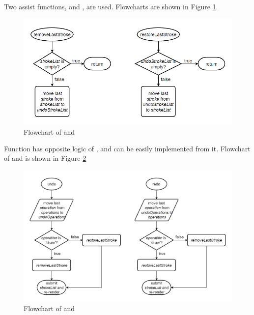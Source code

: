 \documentclass[12pt,twoside]{report}
\begin{document}
Two assist functions,  and , are
used. Flowcharts are shown in Figure \ref{fig:flowchart-helpfunc}.
\begin{figure}[h]
    \centering
    \includegraphics[width=\linewidth]{figures/flowchart-helpfunc.png}
    \caption{Flowchart of  and }
    \label{fig:flowchart-helpfunc}
\end{figure}

Function  has opposite logic of , and can be easily implemented from it. Flowchart of  and  is shown in Figure \ref{fig:flowchart-undoredo}
\begin{figure}[H]
    \centering
    \includegraphics[width=\linewidth, frame]{figures/flowchart-undoredo.png}
    \caption{Flowchart of  and }
    \label{fig:flowchart-undoredo}
\end{figure}
\end{document}

